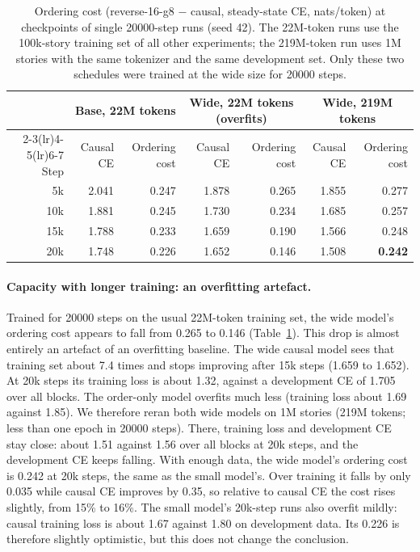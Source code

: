 \documentclass[11pt]{article}
\theoremstyle{definition}
\theoremstyle{remark}
\newcommand{\sch}[1]{\textsf{#1}}
\begin{document}
\begin{table}[t]
  \centering
  \caption{Ordering cost (\sch{reverse-16-g8} $-$ \sch{causal}, steady-state CE, nats/token) at checkpoints of single 20000-step runs (seed 42). The 22M-token runs use the 100k-story training set of all other experiments; the 219M-token run uses 1M stories with the same tokenizer and the same development set. Only these two schedules were trained at the wide size for 20000 steps.}
  \label{tab:widelong}
  \small
  \begin{tabular}{rrrrrrr}
    \toprule
    & \multicolumn{2}{c}{Base, 22M tokens} & \multicolumn{2}{c}{Wide, 22M tokens (overfits)} & \multicolumn{2}{c}{Wide, 219M tokens} \\
    \cmidrule(lr){2-3}\cmidrule(lr){4-5}\cmidrule(lr){6-7}
    Step & Causal CE & Ordering cost & Causal CE & Ordering cost & Causal CE & Ordering cost \\
    \midrule
    5k  & 2.041 & 0.247 & 1.878 & 0.265 & 1.855 & 0.277 \\
    10k & 1.881 & 0.245 & 1.730 & 0.234 & 1.685 & 0.257 \\
    15k & 1.788 & 0.233 & 1.659 & 0.190 & 1.566 & 0.248 \\
    20k & 1.748 & 0.226 & 1.652 & 0.146 & 1.508 & \textbf{0.242} \\
    \bottomrule
  \end{tabular}
\end{table}

\paragraph{Capacity with longer training: an overfitting artefact.}
Trained for 20000 steps on the usual 22M-token training set, the wide model's ordering cost appears to fall from 0.265 to 0.146 (Table~\ref{tab:widelong}).
This drop is almost entirely an artefact of an overfitting baseline.
The wide causal model sees that training set about 7.4 times and stops improving after 15k steps (1.659 to 1.652).
At 20k steps its training loss is about 1.32, against a development CE of 1.705 over all blocks.
The order-only model overfits much less (training loss about 1.69 against 1.85).
We therefore reran both wide models on 1M stories (219M tokens; less than one epoch in 20000 steps).
There, training loss and development CE stay close: about 1.51 against 1.56 over all blocks at 20k steps, and the development CE keeps falling.
With enough data, the wide model's ordering cost is 0.242 at 20k steps, the same as the small model's.
Over training it falls by only 0.035 while causal CE improves by 0.35, so relative to causal CE the cost rises slightly, from 15\% to 16\%.
The small model's 20k-step runs also overfit mildly: causal training loss is about 1.67 against 1.80 on development data.
Its 0.226 is therefore slightly optimistic, but this does not change the conclusion.
\end{document}
